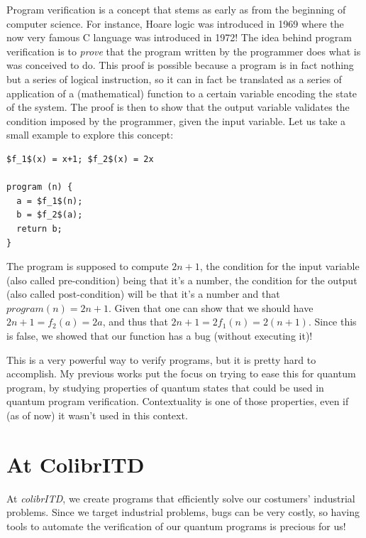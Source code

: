 \documentclass{article}
\begin{document}
Program verification is a concept that stems as early as from the beginning of
computer science. For instance, Hoare logic \cite{Hoa69} was introduced in 1969
where the now very famous C language was introduced in 1972! The idea behind
program verification is to \emph{prove} that the program written by the
programmer does what is was conceived to do. This proof is possible because a
program is in fact nothing but a series of logical instruction, so it can in fact
be translated as a series of application of a (mathematical) function to a
certain variable encoding the state of the system. The proof is then to show that
the output variable validates the condition imposed by the programmer, given the
input variable. Let us take a small example to explore this concept:
\begin{lstlisting}
$f_1$(x) = x+1; $f_2$(x) = 2x

program (n) {
  a = $f_1$(n);
  b = $f_2$(a);
  return b;
}
\end{lstlisting}
The program is supposed to compute $2n+1$, the condition for the input variable
(also called pre-condition) being that it's a number, the condition for the
output (also called post-condition) will be that it's a number and that 
$program(n)=2n+1$. Given that one can show that we should have $2n+1=f_2(a)=2a$,
and thus that $2n+1=2f_1(n)=2(n+1)$. Since this is false, we showed that our
function has a bug (without executing it)!

This is a very powerful way to verify programs, but it is pretty hard to
accomplish. My previous works put the focus on trying to ease this for quantum
program, by studying properties of quantum states that could be used in quantum
program verification. Contextuality is one of those properties, even if (as of
now) it wasn't used in this context.

\section*{At ColibrITD}

At \emph{colibrITD}, we create programs that efficiently solve our costumers'
industrial problems. Since we target industrial problems, bugs can be very
costly, so having tools to automate the verification of our quantum programs is
precious for us!



\end{document}
